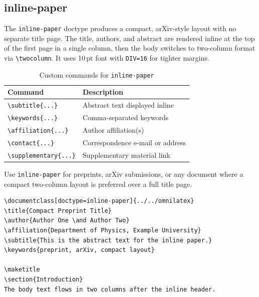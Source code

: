 \subsection{inline-paper}

The \texttt{inline-paper} doctype produces a compact, arXiv-style layout with
no separate title page.  The title, authors, and abstract are rendered inline
at the top of the first page in a single column, then the body switches to
two-column format via \texttt{\textbackslash twocolumn}.  It uses 10\,pt font
with \texttt{DIV=16} for tighter margins.

\begin{table}[htbp]
    \centering
    \caption{Custom commands for \texttt{inline-paper}}
    \label{tab:inlinepaper-commands}
    \begin{tabular}{@{} l p{8cm} @{}}
        \toprule
        \textbf{Command} & \textbf{Description} \\
        \midrule
        \texttt{\textbackslash subtitle\{...\}}      & Abstract text displayed inline \\
        \texttt{\textbackslash keywords\{...\}}      & Comma-separated keywords \\
        \texttt{\textbackslash affiliation\{...\}}   & Author affiliation(s) \\
        \texttt{\textbackslash contact\{...\}}       & Correspondence e-mail or address \\
        \texttt{\textbackslash supplementary\{...\}} & Supplementary material link \\
        \bottomrule
    \end{tabular}
\end{table}

Use \texttt{inline-paper} for preprints, arXiv submissions, or any document
where a compact two-column layout is preferred over a full title page.

\begin{verbatim}
\documentclass[doctype=inline-paper]{../../omnilatex}
\title{Compact Preprint Title}
\author{Author One \and Author Two}
\affiliation{Department of Physics, Example University}
\subtitle{This is the abstract text for the inline paper.}
\keywords{preprint, arXiv, compact layout}

\maketitle
\section{Introduction}
The body text flows in two columns after the inline header.

\end{verbatim}

